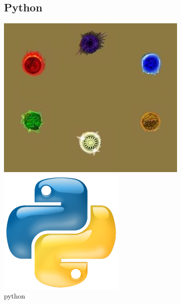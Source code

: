 \documentclass[10pt]{article}
\begin{document}
{\begin{flushleft}
\section{Python}
\vspace{0.4in}
\begin{abstract}
\vspace{0.2in}
\large{Este es el segunto trabajo de Lenguajes de Programaci\'on, donde se nos pidi\'o realizar un proyecto en Python el cual utilizara sonidos para hallar la salida o las posibles respuestas, m\'as espec\'ifico, se nos pidi\'o realizar un juego que tenga como recurso principal los sonidos.\\
El tema de proyecto escogido fue elementsBalls, el cual b\'asicamente es un juego que exige desarrollar la agilidad mental, porque da una respuesta y se tiene que hallar la salida en el menor tiempo posible.\\
elementsBalls ha sido desarrollado totalmente en python utilizando la librer\'ia pygame. Python es bastante estable y da mucha flexibilidad al momento de programar, esto hizo de esta experiencia algo bastante agradable.\\
Con todo esto elementsBalls es un juego bastante interesante, con interacci\'on entre el jugador y el juego, es un juego que te desaf\'ia a desafiarte.}
\end{abstract}
\begin{center}
\vspace{0.3in}
\includegraphics[scale=0.5]{gameEnd}
\\\vspace{0.3in}
\includegraphics[scale=0.2]{logPython}\\python
\end{center}



\end{flushleft}}
\end{document}
